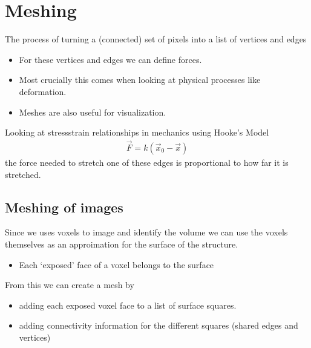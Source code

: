 \documentclass[letterpaper,10pt,english]{sphinxmanual}
\begin{document}
\chapter{Meshing}
\label{\detokenize{06-AdvancedShapeAndTexture:meshing}}
\sphinxAtStartPar
The process of turning a (connected) set of pixels into a list of vertices and edges
\begin{itemize}
\item {} 
\sphinxAtStartPar
For these vertices and edges we can define forces.

\item {} 
\sphinxAtStartPar
Most crucially this comes when looking at physical processes like deformation.

\item {} 
\sphinxAtStartPar
Meshes are also useful for visualization.

\end{itemize}

\sphinxAtStartPar
{}

\sphinxAtStartPar
{}

\sphinxAtStartPar
Looking at stress\sphinxhyphen{}strain relationships in mechanics using Hooke’s Model
\begin{equation*}
\begin{split} \vec{F}=k (\vec{x}_0-\vec{x}) \end{split}
\end{equation*}
\sphinxAtStartPar
the force needed to stretch one of these edges is proportional to how far it is stretched.


\section{Meshing of images}
\label{\detokenize{06-AdvancedShapeAndTexture:meshing-of-images}}
\sphinxAtStartPar
Since we uses voxels to image and identify the volume we can use the voxels themselves as an approimation for the surface of the structure.
\begin{itemize}
\item {} 
\sphinxAtStartPar
Each ‘exposed’ face of a voxel belongs to the surface

\end{itemize}

\sphinxAtStartPar
From this we can create a mesh by
\begin{itemize}
\item {} 
\sphinxAtStartPar
adding each exposed voxel face to a list of surface squares.

\item {} 
\sphinxAtStartPar
adding connectivity information for the different squares (shared edges and vertices)

\end{itemize}
\end{document}

